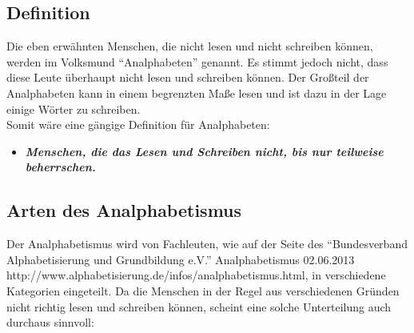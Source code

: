 \subsection{Definition}



Die eben erwähnten Menschen, die nicht lesen und nicht schreiben können, werden im Volksmund "`Analphabeten"' genannt. Es stimmt jedoch nicht, dass diese Leute überhaupt nicht lesen und schreiben können. Der Großteil der Analphabeten kann in einem begrenzten Maße lesen und ist dazu in der Lage einige Wörter zu schreiben.\\

Somit wäre eine gängige Definition für Analphabeten:\\
\begin{itemize}
	\item \textbf{\textit{Menschen, die das Lesen und Schreiben nicht, bis nur teilweise beherrschen.}}
\end{itemize}



\subsection{Arten des Analphabetismus}

Der Analphabetismus wird von Fachleuten, wie auf der Seite des "`Bundesverband Alphabetisierung und Grundbildung e.V."'
				{Analphabetismus}
				{02.06.2013}
				{http://www.alphabetisierung.de/infos/analphabetismus.html}, 
in verschiedene Kategorien eingeteilt. Da die Menschen in der Regel aus verschiedenen Gründen nicht richtig lesen und schreiben können, scheint eine solche Unterteilung auch durchaus sinnvoll:


